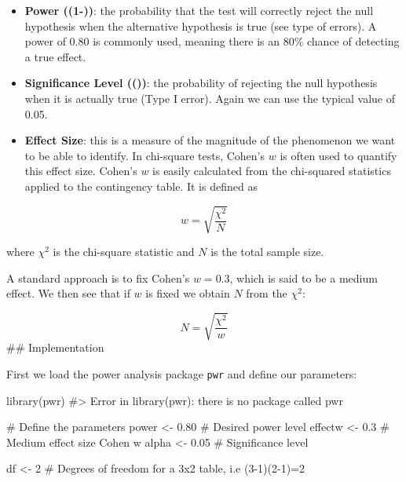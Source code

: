 \documentclass[
  letterpaper,
  DIV=11,
  numbers=noendperiod]{scrreprt}
\newenvironment{Shaded}{\begin{snugshade}}{\end{snugshade}}
\newcommand{\CommentTok}[1]{\textcolor[rgb]{0.37,0.37,0.37}{#1}}
\newcommand{\DecValTok}[1]{\textcolor[rgb]{0.68,0.00,0.00}{#1}}
\newcommand{\FloatTok}[1]{\textcolor[rgb]{0.68,0.00,0.00}{#1}}
\newcommand{\FunctionTok}[1]{\textcolor[rgb]{0.28,0.35,0.67}{#1}}
\newcommand{\NormalTok}[1]{\textcolor[rgb]{0.00,0.23,0.31}{#1}}
\newcommand{\OtherTok}[1]{\textcolor[rgb]{0.00,0.23,0.31}{#1}}
\begin{document}
\begin{itemize}
\item
  \textbf{Power ((1-\beta))}: the probability that the test will
  correctly reject the null hypothesis when the alternative hypothesis
  is true (see type of errors). A power of 0.80 is commonly used,
  meaning there is an 80\% chance of detecting a true effect.
\item
  \textbf{Significance Level ((\alpha))}: the probability of rejecting
  the null hypothesis when it is actually true (Type I error). Again we
  can use the typical value of 0.05.
\item
  \textbf{Effect Size}: this is a measure of the magnitude of the
  phenomenon we want to be able to identify. In chi-square tests,
  Cohen's \(w\) is often used to quantify this effect size. Cohen's
  \(w\) is easily calculated from the chi-squared statistics applied to
  the contingency table. It is defined as
\end{itemize}

\[w = \sqrt{\frac{\chi^2}{N}}\]

where \(\chi^2\) is the chi-square statistic and \(N\) is the total
sample size.

A standard approach is to fix Cohen's \(w=0.3\), which is said to be a
medium effect. We then see that if \(w\) is fixed we obtain \(N\) from
the \(\chi^2\):

\[N = \sqrt{\frac{\chi^2}{w}}\] \#\# Implementation

First we load the power analysis package \texttt{pwr} and define our
parameters:

\begin{Shaded}
\begin{Highlighting}[]
\FunctionTok{library}\NormalTok{(pwr)}
\CommentTok{\#\textgreater{} Error in library(pwr): there is no package called \textquotesingle{}pwr\textquotesingle{}}

\CommentTok{\# Define the parameters}
\NormalTok{power }\OtherTok{\textless{}{-}} \FloatTok{0.80} \CommentTok{\# Desired power level}
\NormalTok{effectw }\OtherTok{\textless{}{-}} \FloatTok{0.3} \CommentTok{\# Medium effect size Cohen w}
\NormalTok{alpha }\OtherTok{\textless{}{-}} \FloatTok{0.05} \CommentTok{\# Significance level}

\NormalTok{df }\OtherTok{\textless{}{-}} \DecValTok{2} \CommentTok{\# Degrees of freedom for a 3x2 table, i.e (3{-}1)(2{-}1)=2}
\end{Highlighting}
\end{Shaded}
\end{document}
